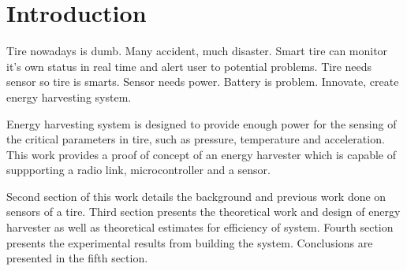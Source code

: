 \section{Introduction}

\thispagestyle{empty}

Tire nowadays is dumb. Many accident, much disaster. Smart tire can monitor it's own status in real time and alert user to potential problems.
Tire needs sensor so tire is smarts. Sensor needs power. Battery is problem. Innovate, create energy harvesting system. 

Energy harvesting system is designed to provide enough power for the sensing of the critical parameters in tire, such as pressure, temperature and acceleration. This work provides a proof of concept of an energy harvester which is capable of suppporting a radio link, microcontroller and a sensor. 

Second section of this work details the background and previous work done on sensors of a tire. Third section presents the theoretical work and design of energy harvester as well as theoretical estimates for efficiency of system. Fourth section presents the experimental results from building the system. Conclusions are presented in the fifth section.




